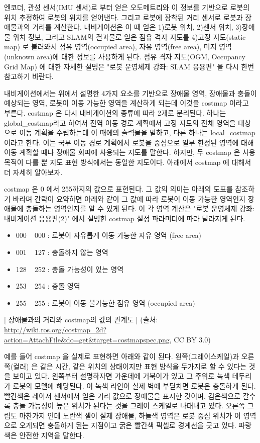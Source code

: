 엔코더, 관성 센서(IMU 센서)로 부터 얻은 오도메트리와 이 정보를 기반으로 로봇의 위치 추정하여 로봇의 위치를 얻어낸다. 그리고 로봇에 장착된 거리 센서로 로봇과 장애물과의 거리를 계산한다. 내비게이션은 이 때 얻은 1)로봇 위치, 2)센서 위치, 3)장애물 위치 정보, 그리고 SLAM의 결과물로 얻은 점유 격자 지도를 4)고정 지도(static map) 로 불러와서 점유 영역(occupied area), 자유 영역(free area), 미지 영역(unknown area)에 대한 정보를 사용하게 된다. 점유 격자 지도(OGM, Occupancy Grid Map) 에 대한 자세한 설명은 "로봇 운영체제 강좌: SLAM 응용편" 을 다시 한번 참고하기 바란다.

내비게이션에서는 위에서 설명한 4가지 요소를 기반으로 장애물 영역, 장애물과 충돌이 예상되는 영역, 로봇이 이동 가능한 영역을 계산하게 되는데 이것을 costmap 이라고 부른다. costmap 은 다시 내비게이션의 종류에 따라 2개로 분리된다. 하나는 global\_costmap라고 하여서 전역 이동 경로 계획에서 고정 지도의 전체 영역을 대상으로 이동 계획을 수립하는데 이 때에의 출력물을 말하고, 다른 하나는 local\_costmap 이라고 한다. 이는 국부 이동 경로 계획에서 로봇을 중심으로 일부 한정된 영역에 대해 이동 계획할 때나 장애물 회피에 사용되는 지도를 말한다. 하지만, 두 costmap 은 사용 목적이 다를 뿐 지도 표현 방식에서는 동일한 지도이다. 아래에서 costmap 에 대해서 더 자세히 알아보자.

costmap 은 0 에서 255까지의 값으로 표현된다. 그 값의 의미는 아래의 도표를 참조하기 바라며 간략이 요약하면 아래와 같이 그 값에 따라 로봇이 이동 가능한 영역인지 장애물에 충돌하는 영역인지를 알 수 있게 된다. 이 각 영역 계산은 "로봇 운영체제 강좌: 내비게이션 응용편(2)" 에서 설명한 costmap 설정 파라미터에 따라 달라지게 된다.

\begin{itemize}[leftmargin=*]
\item 000 ~ 000 : 로봇이 자유롭게 이동 가능한 자유 영역 (free area)
\item 001 ~ 127 : 충돌하지 않는 영역
\item 128 ~ 252 : 충돌 가능성이 있는 영역
\item 253 ~ 254 : 충돌 영역
\item 255 ~ 255 : 로봇이 이동 불가능한 점유 영역 (occupied area)
\end{itemize}

[ 장애물과의 거리와 costmap의 값의 관계도 ]
(출처: \url{http://wiki.ros.org/costmap_2d?action=AttachFile&do=get&target=costmapspec.png}, CC BY 3.0)

예를 들어 costmap 을 실제로 표현하면 아래와 같이 된다. 왼쪽(그레이스케일)과 오른쪽(컬러) 은 같은 시간, 같은 위치의 상태이지만 표현 방식을 두가지로 할 수 있다는 것을 보이고 있다. 왼쪽부터 설명하자면 가운데에 거북이가 있고 그 주위로 녹색 테두리가 로봇의 모델에 해당된다. 이 녹색 라인이 실제 벽에 부딛치면 로봇은 충돌하게 된다. 빨간색은 레이저 센서에서 얻은 거리 값으로 장애물을 표시한 것이며, 검은색으로 갈수록 충돌 가능성이 높은 위치가 된다는 것을 그레이 스케일로 나태내고 있다. 오른쪽 그림도 마찬가지 인데 노란색 셀이 실제 장애물, 하늘색 영역은 로봇 중심 위치가 이 영역으로 오게되면 충돌하게 된는 지점이고 굵은 빨간색 픽셀로 경계선을 긋고 있다. 파랑색은 안전한 지역을 말한다.

